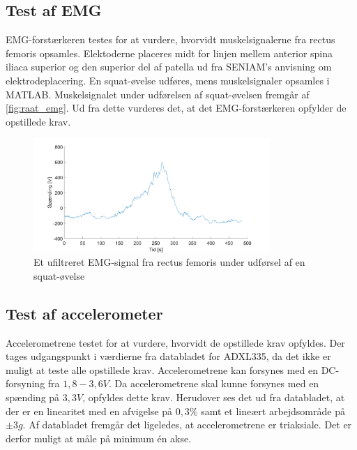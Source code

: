 \subsection{Test af EMG}

EMG-forstærkeren testes for at vurdere, hvorvidt muskelsignalerne fra rectus femoris opsamles. Elektoderne placeres midt for linjen mellem anterior spina iliaca superior og den superior del af patella ud fra SENIAM's anvisning om elektrodeplacering. En squat-øvelse udføres, mens muskelsignaler opsamles i MATLAB. Muskelsignalet under udførelsen af squat-øvelsen fremgår af \autoref{fig:raat_emg}. Ud fra dette vurderes det, at det EMG-forstærkeren opfylder de opstillede krav. 

\begin{figure}[H]
\centering
\includegraphics[width=0.8\textwidth]{figures/raat_EMG_test}
\caption{Et ufiltreret EMG-signal fra rectus femoris under udførsel af en squat-øvelse}
\label{fig:raat_emg}
\end{figure}

\subsection{Test af accelerometer}

Accelerometrene testet for at vurdere, hvorvidt de opstillede krav opfyldes. Der tages udgangspunkt i værdierne fra databladet for ADXL335, da det ikke er muligt at teste alle opstillede krav. Accelerometrene kan forsynes med en DC-forsyning fra $1,8-3,6 V$. Da accelerometrene skal kunne forsynes med en spænding på $3,3 V$, opfyldes dette krav. Herudover ses det ud fra databladet, at der er en linearitet med en afvigelse på $0,3\%$ samt et lineært arbejdsområde på $ \pm 3 g$. Af databladet fremgår det ligeledes, at accelerometrene er triaksiale. Det er derfor muligt at måle på minimum én akse.  

